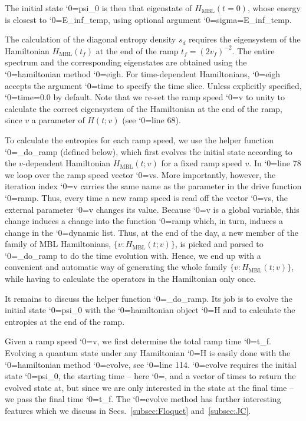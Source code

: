 \documentclass{SciPost}
\newcommand\0{\scalebox{-1}[1]{0}}
\let\svttfamily\ttfamily
\renewcommand\ttfamily{\svttfamily\catcode`0=\active }
\renewcommand\texttt{\bgroup\ttfamily\texttthelp}
\def\texttthelp#1{#1\egroup}
\begin{document}

%
The initial state \texttt{psi\_0} is then that eigenstate of $H_\mathrm{MBL}(t=0)$, whose energy is closest to \texttt{E\_inf\_temp}, using optional argument \texttt{sigma=E\_inf\_temp}.

%
The calculation of the diagonal entropy density $s_d$ requires the eigensystem of the Hamiltonian $H_\mathrm{MBL}(t_f)$ at the end of the ramp $t_f=(2v_f)^{-2}$. The entire spectrum and the corresponding eigenstates are obtained using the \texttt{hamiltonian} method \texttt{eigh}. For time-dependent Hamiltonians, \texttt{eigh} accepts the argument \texttt{time} to specify the time slice. Unless explicitly specified, \texttt{time=0.0} by default. Note that we re-set the ramp speed \texttt{v} to unity to calculate the correct eigensystem of the Hamiltonian at the end of the ramp, since $v$ a parameter of $H(t;v)$ (see \texttt{line 68}).

%
To calculate the entropies for each ramp speed, we use the helper function \texttt{\_do\_ramp} (defined below), which first evolves the initial state according to the $v$-dependent Hamiltonian $H_\mathrm{MBL}(t;v)$ for a fixed ramp speed $v$. In \texttt{line 78} we loop over the ramp speed vector \texttt{vs}. More importantly, however, the iteration index \texttt{v} carries the same name as the parameter in the drive function \texttt{ramp}. Thus, every time a new ramp speed is read off the vector \texttt{vs}, the external parameter \texttt{v} changes its value. Because \texttt{v} is a global variable, this change induces a change into the function \texttt{ramp} which, in turn, induces a change in the \texttt{dynamic} list. Thus, at the end of the day, a new member of the family of MBL Hamiltonians, $\{v: H_\mathrm{MBL}(t;v)\}$, is picked and parsed to \texttt{\_do\_ramp} to do the time evolution with. Hence, we end up with a convenient and automatic way of generating the whole family $\{v: H_\mathrm{MBL}(t;v)\}$, while having to calculate the operators in the Hamiltonian only once. 

%
It remains to discuss the helper function \texttt{\_do\_ramp}. Its job is to evolve the initial state \texttt{psi\_0} with the \texttt{hamiltonian} object \texttt{H} and to calculate the entropies at the end of the ramp. 

% 
Given a ramp speed \texttt{v}, we first determine the total ramp time \texttt{t\_f}. Evolving a quantum state under any Hamiltonian \texttt{H} is easily done with the \texttt{hamiltonian} method \texttt{evolve}, see \texttt{line 114}. \texttt{evolve} requires the initial state \texttt{psi\_0}, the starting time -- here \texttt{0.0}, and a vector of times to return the evolved state at, but since we are only interested in the state at the final time -- we pass the final time \texttt{t\_f}. The \texttt{evolve} method has further interesting features which we discuss in Secs.~\ref{subsec:Floquet} and~\ref{subsec:JC}.
\end{document}
